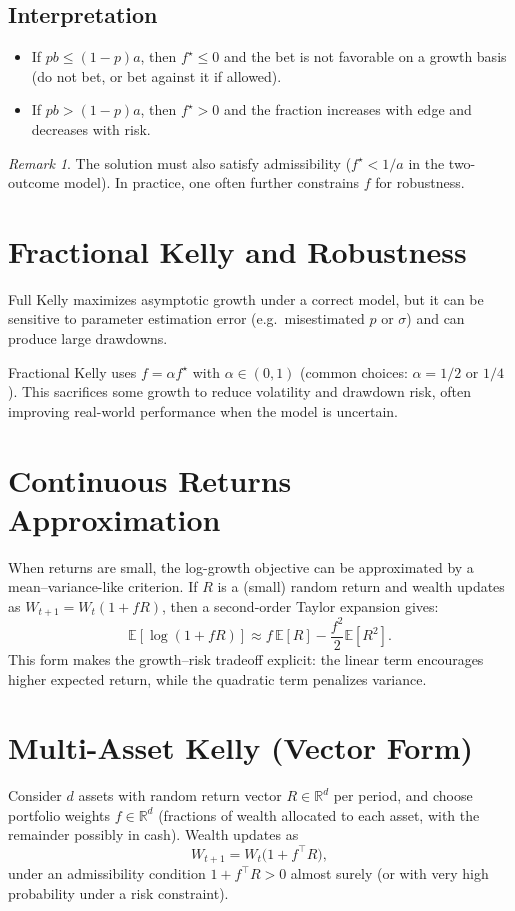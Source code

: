 \documentclass[11pt]{article}
\theoremstyle{plain}
\theoremstyle{definition}
\theoremstyle{remark}
\newtheorem{remark}[theorem]{Remark}
\newcommand{\E}{\mathbb{E}}
\newcommand{\R}{\mathbb{R}}
\newcommand{\1}{\mathbf{1}}
\begin{document}
\subsection{Interpretation}
\begin{itemize}
\item If $pb\le (1-p)a$, then $f^\star\le 0$ and the bet is not favorable on a growth basis (do not bet, or bet against it if allowed).
\item If $pb>(1-p)a$, then $f^\star>0$ and the fraction increases with edge and decreases with risk.
\end{itemize}

\begin{remark}
The solution must also satisfy admissibility ($f^\star<1/a$ in the two-outcome model). In practice, one often further constrains $f$ for robustness.
\end{remark}

\section{Fractional Kelly and Robustness}
Full Kelly maximizes asymptotic growth under a correct model, but it can be sensitive to parameter estimation error (e.g.\ misestimated $p$ or $\sigma$) and can produce large drawdowns.

Fractional Kelly uses $f=\alpha f^\star$ with $\alpha\in(0,1)$ (common choices: $\alpha=1/2$ or $1/4$). This sacrifices some growth to reduce volatility and drawdown risk, often improving real-world performance when the model is uncertain.

\section{Continuous Returns Approximation}
When returns are small, the log-growth objective can be approximated by a mean--variance-like criterion. If $R$ is a (small) random return and wealth updates as $W_{t+1}=W_t(1+fR)$, then a second-order Taylor expansion gives:
\[
\E[\log(1+fR)] \approx f\,\E[R] - \frac{f^2}{2}\E[R^2].
\]
This form makes the growth--risk tradeoff explicit: the linear term encourages higher expected return, while the quadratic term penalizes variance.

\section{Multi-Asset Kelly (Vector Form)}
Consider $d$ assets with random return vector $R\in\R^d$ per period, and choose portfolio weights $f\in\R^d$ (fractions of wealth allocated to each asset, with the remainder possibly in cash). Wealth updates as
\[
W_{t+1}=W_t\bigl(1+ f^\top R\bigr),
\]
under an admissibility condition $1+f^\top R>0$ almost surely (or with very high probability under a risk constraint).
\end{document}
